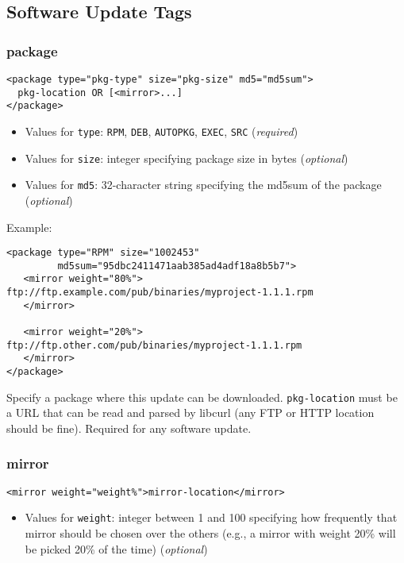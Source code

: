 \documentclass{report}
\begin{document}
\subsection{Software Update Tags}

\subsubsection{package}

\begin{verbatim}
<package type="pkg-type" size="pkg-size" md5="md5sum">
  pkg-location OR [<mirror>...]
</package>
\end{verbatim}

\begin{itemize}
\item Values for \texttt{type}: \texttt{RPM}, \texttt{DEB}, \texttt{AUTOPKG}, \texttt{EXEC}, \texttt{SRC} (\emph{required})
\item Values for \texttt{size}: integer specifying package size in bytes (\emph{optional})
\item Values for \texttt{md5}: 32-character string specifying the md5sum of the package (\emph{optional})
\end{itemize}

Example:


{\small
\begin{verbatim}
<package type="RPM" size="1002453"
         md5sum="95dbc2411471aab385ad4adf18a8b5b7">
   <mirror weight="80%">
ftp://ftp.example.com/pub/binaries/myproject-1.1.1.rpm
   </mirror>

   <mirror weight="20%">
ftp://ftp.other.com/pub/binaries/myproject-1.1.1.rpm
   </mirror>
</package>
\end{verbatim}
}


Specify a package where this update can be downloaded.  \texttt{pkg-location} must be a URL that can be read and parsed by libcurl (any FTP or HTTP location should be fine). Required for any software update.

\subsubsection{mirror}
\verb+<mirror weight="weight%">mirror-location</mirror>+

\begin{itemize}
\item Values for \texttt{weight}: integer between 1 and 100 specifying how frequently that mirror should be chosen over the others (e.g., a mirror with weight 20\% will be picked 20\% of the time) (\emph{optional})
\end{itemize}
\end{document}

